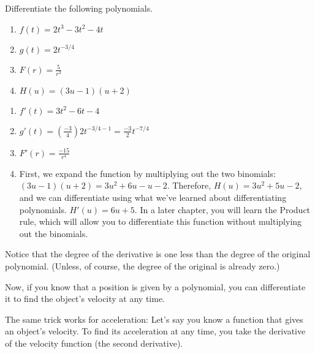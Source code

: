 \begin{Exercise}[title={Differentiation of polynomials}, label=diffpoly]
  Differentiate the following polynomials.
  \begin{enumerate}
  \item $f(t)=2t^3-3t^2-4t$
  \item $g(t)=2t^{-3/4}$
  \item $F(r) = \frac{5}{r^3}$
  \item $H(u) = (3u-1)(u+2)$
  \end{enumerate}
  \end{Exercise}
\begin{Answer}[ref=diffpoly]
\begin{enumerate}
\item $f'(t) = 3t^2-6t-4$
\item $g'(t) = (\frac{-3}{4})2t^{-3/4-1}=\frac{-3}{2}t^{-7/4}$
\item $F'(r) = \frac{-15}{r^4}$
\item First, we expand the function by multiplying out the two binomials: $(3u-1)(u+2)=3u^2+6u-u-2$. Therefore, $H(u) = 3u^2+5u-2$, and we can differentiate using what we've learned about differentiating polynomials. $H'(u) = 6u+5$. In a later chapter, you will learn the Product rule, which will allow you to differentiate this function without multiplying out the binomials. 
\end{enumerate}
\end{Answer}
Notice that the degree of the derivative is one less than the degree
of the original polynomial. (Unless, of course, the degree of the
original is already zero.)

Now, if you know that a position is given by a polynomial, you can
differentiate it to find the object's velocity at any time.

The same trick works for acceleration: Let's say you know a function
that gives an object's velocity. To find its acceleration at any time,
you take the derivative of the velocity function (the second derivative). 

